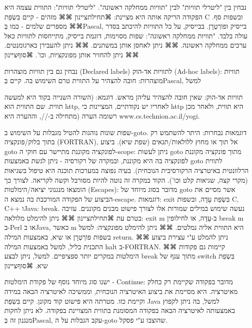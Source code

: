         נבחין בין "ליטרלי תוויות" לבין "תוויות ממחלקה ראשונה".
        "ליטרלי תוויות": התווית עצמה היא הפקודה הריקה אותה היא מציינת:
        ⌘תחילת{ציינון}
        ⌘⌘ מזהים - קיים בִּשְׂפַת C ובשפות סף.
        ⌘⌘ מספרים שלמים - כמו בְּPascal, בייסיק ופוֹרְטְרָן. בבייסיק, על כל התוויות להיכתב בסדר עולה בלבד.
        "תוויות ממחלקה ראשונה": שפות מסוימות, דוגמת בייסיק, מתייחסות לתוויות כאל ערכים ממחלקה ראשונה.
        ⌘⌘ ניתן לאחסן אותן במשתנים.
        ⌘⌘ ניתן להעבירן כארגומנטים.
        ⌘⌘ ניתן להחזיר אותן מפונקציות, וכו'.
      ⌘סוף{ציינון}

        נבחין גם בין תוויות מוצהרות (Declared labels) לתוויות אד-הוק (Ad-hoc labels):
        תוויות מוצהרות: חובה להצהיר על התווית טרם השימוש בה. קיים בְּPascal, למשל

        תוויות אד-הוק:
        שאין חובה להצהיר עליהן מראש. דוגמא:
        (השורה השנייה בקוד היא למעשה תווית. שם התווית הוא http, לאחריו יש נקודתיים, המציינות כי http היא תווית, ולאחר מכן רשומה הערה (מתחילה ב-//, וההערה היא www.cs.technion.ac.il/yogi.

        שפות שונות נוהגות להטיל מגבלות על השימוש ב-goto. דוגמאות נבחרות: היתר להשתמש רק בתוך בלוק/פונקציה (FORTRAN), אל תוך או מחוץ ללולאות/תנאים (שפת שיא).
        ביצוע goto לפונקציה מקוננת מתיישר עם חוקי ה-scope: ניתן לעשות goto מתוך פונקציה מקוננת לפונקציה בה היא מקוננת, ובמקרה של רקורסיה - ניתן לגשת באמצעות goto לתווית הרלוונטית באיטרציה הרקורסיבית הנוכחית).
        בעיה נפוצה במערכות תוכנה היא טיפול בשגיאות (מקרי קצה, שגיאות קלט וכו'). הקוד במקרה זה נוטה להיות מסורבל וקשה לקריאה. לצורך כך הומצאו מנגנוני יציאה/הימלטות (Escapes): מדובר בסוג מיוחד של goto אשר מסיים את הביצוע של הפקודה המורכבת בה נמצא ה-escape. דוגמאות: exit בִּשְׂפַת עָדָה, ובשפות C, C++ וJava: break. נעשה שימוש במילים שמורות אלו לצורך פישוט מבנים מקוננים.
        עזיבה בטרם עת
        ⌘תחילת{ציינון}
        ⌘⌘ ניתן להימלט מלולאה: exit m ב-עָדָה, או לחילופין break m ב-Perl או בJava, כאשר m היא התווית אליה נמלטים.
        ⌘⌘ ניתן להימלט מפונקציה: למשל בשפות פוֹרְטְרָן או שיא, באמצעות המילה return.
        ⌘⌘ ניתן להמלט ע"י עצירת ביצוע התכנית כליל, למשל באמצעות המילה halt ב-FORTRAN.
        ⌘⌘ קיימות גם פקודות הימלטות במקרים יותר ספציפיים. למשל, ניתן לבצע break מתוך ענף של switch בִּשְׂפַת שיא.
      ⌘סוף{ציינון}

        ישנו סוג מיוחד נוסף של פקודת הימלטות - Continue: מדובר בפקודה שקיימת רק כחלק מאיטרציה. היא מסיימת את ביצוע האיטרציה הנוכחית, וממשיכה לאיטרציה הבאה במידה וקיימת כזו. מטרתה היא פישוט קוד מקונן. קיים בִּשְׂפַת Java למשל, בה ניתן לקפוץ באמצעותה לאיטרציה הבאה בפקודה המסומנת בתווית המצויינת בפקודה. לא ניתן לחקות מנגנון זה בְּPascal, עקב הגבלות על ה-goto שהוצבו ע"י פסקל.


